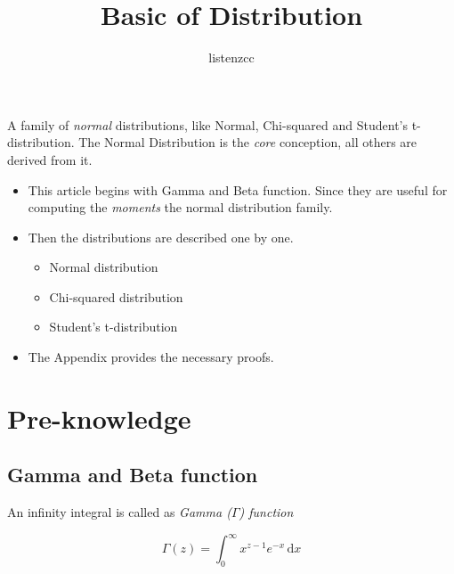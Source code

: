 \documentclass[a4paper]{article}
\title{Basic of Distribution}
\author{listenzcc}
\begin{document}

\maketitle

\abstract
A family of \emph{normal} distributions, like
Normal, Chi-squared and Student's t-distribution.
The Normal Distribution is the \emph{core} conception,
all others are derived from it.

\begin{itemize}
    \item This article begins with Gamma and Beta function.
          Since they are useful for computing the \emph{moments} the normal distribution family.
    \item Then the distributions are described one by one.
          \begin{itemize}
              \item Normal distribution
              \item Chi-squared distribution
              \item Student's t-distribution
          \end{itemize}
    \item The Appendix provides the necessary proofs.
\end{itemize}

\newpage

\tableofcontents

\newpage

\section{Pre-knowledge}

\subsection{Gamma and Beta function}

An infinity integral is called as \emph{Gamma ($\Gamma$) function}

\begin{equation}
    \Gamma(z) = \int_{0}^{\infty} x^{z-1} e^{-x} \,\mathrm{d}x
\end{equation}
\end{document}
